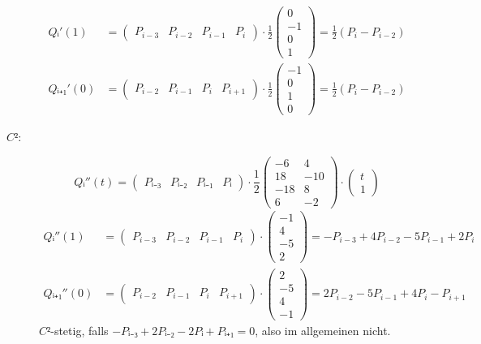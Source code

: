 \documentclass[a4paper,12pt]{scrartcl}
\newcommand{\pmat}[1]{\begin{pmatrix}#1\end{pmatrix}}
\begin{document}
\begin{description}
\begin{align*}
    Qᵢ'(1) &= \pmat{P_{i-3} & P_{i-2} & P_{i-1} & P_{i}} · \frac12
    \pmat{0 \\ -1 \\ 0 \\ 1} = \frac12 \left(P_{i} - P_{i-2}\right) \\
    Qᵢ₊₁'(0) &= \pmat{P_{i-2} & P_{i-1} & P_{i} & P_{i+1}} · \frac12
    \pmat{-1 \\ 0 \\ 1 \\ 0} = \frac12 \left(P_{i} - P_{i-2}\right)
  \end{align*}
\item[$C²$:] \mbox{}
  \[ Qᵢ''(t) = \pmat{Pᵢ₋₃ & Pᵢ₋₂ & Pᵢ₋₁ & Pᵢ} · \frac12
  \pmat{-6 & 4 \\ 18 & -10 \\ -18 & 8 \\ 6 & -2} ·
  \pmat{t \\ 1} \]
  \begin{align*}
    Qᵢ''(1) &= \pmat{P_{i-3} & P_{i-2} & P_{i-1} & P_{i}} ·
    \pmat{-1 \\ 4 \\ -5 \\ 2} = -P_{i-3} + 4P_{i-2} - 5P_{i-1} + 2P_{i} \\
    Qᵢ₊₁''(0) &= \pmat{P_{i-2} & P_{i-1} & P_{i} & P_{i+1}} ·
    \pmat{2 \\ -5 \\ 4 \\ -1} = 2P_{i-2} - 5P_{i-1} + 4P_{i} - P_{i+1}
  \end{align*}
  $C²$-stetig, falls $-Pᵢ₋₃ + 2Pᵢ₋₂ -  2Pᵢ + Pᵢ₊₁ = 0$, also im
  allgemeinen nicht.
\end{description}
\end{document}
